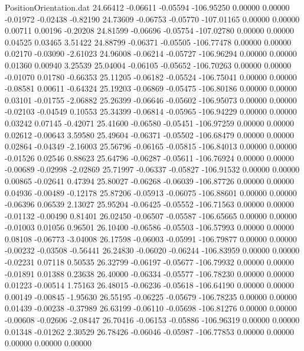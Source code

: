 \begin{filecontents}{PositionOrientation.dat}
  24.66412   -0.06611   -0.05594  -106.95250    0.00000    0.00000   -0.01972   -0.02438   -0.82190
  24.73609   -0.06753   -0.05770  -107.01165    0.00000    0.00000    0.00711    0.00196   -0.20208
  24.81599   -0.06696   -0.05754  -107.02780    0.00000    0.00000    0.04525    0.03465    3.51422
  24.88799   -0.06371   -0.05505  -106.77478    0.00000    0.00000    0.02170   -0.03090   -2.61023
  24.96008   -0.06214   -0.05727  -106.96294    0.00000    0.00000    0.01360    0.00940    3.25539
  25.04004   -0.06105   -0.05652  -106.70263    0.00000    0.00000   -0.01070    0.01780   -0.66353
  25.11205   -0.06182   -0.05524  -106.75041    0.00000    0.00000   -0.08581    0.00611   -0.64324
  25.19203   -0.06869   -0.05475  -106.80186    0.00000    0.00000    0.03101   -0.01755   -2.06882
  25.26399   -0.06646   -0.05602  -106.95073    0.00000    0.00000   -0.02103   -0.04549    0.10553
  25.34399   -0.06814   -0.05965  -106.94229    0.00000    0.00000    0.03242    0.07145   -0.42071
  25.41600   -0.06580   -0.05451  -106.97259    0.00000    0.00000    0.02612   -0.00643    3.59580
  25.49604   -0.06371   -0.05502  -106.68479    0.00000    0.00000    0.02864   -0.04349   -2.16003
  25.56796   -0.06165   -0.05815  -106.84013    0.00000    0.00000   -0.01526    0.02546    0.88623
  25.64796   -0.06287   -0.05611  -106.76924    0.00000    0.00000   -0.00689   -0.02998   -2.02869
  25.71997   -0.06337   -0.05827  -106.91532    0.00000    0.00000    0.00865   -0.02641    0.47394
  25.80027   -0.06268   -0.06039  -106.87726    0.00000    0.00000    0.04936   -0.00489   -0.12178
  25.87206   -0.05913   -0.06075  -106.88601    0.00000    0.00000   -0.06396    0.06539    2.13027
  25.95204   -0.06425   -0.05552  -106.71563    0.00000    0.00000   -0.01132   -0.00490    0.81401
  26.02450   -0.06507   -0.05587  -106.65665    0.00000    0.00000   -0.01003    0.01056    0.96501
  26.10400   -0.06586   -0.05503  -106.57993    0.00000    0.00000    0.08108   -0.06773   -3.04008
  26.17598   -0.06003   -0.05991  -106.79877    0.00000    0.00000   -0.00232   -0.03508   -0.56441
  26.24830   -0.06020   -0.06244  -106.83959    0.00000    0.00000   -0.02231    0.07118    0.50535
  26.32799   -0.06197   -0.05677  -106.79932    0.00000    0.00000   -0.01891    0.01388    0.23638
  26.40000   -0.06334   -0.05577  -106.78230    0.00000    0.00000    0.01223   -0.00514    1.75163
  26.48015   -0.06236   -0.05618  -106.64190    0.00000    0.00000    0.00149   -0.00845   -1.95630
  26.55195   -0.06225   -0.05679  -106.78235    0.00000    0.00000    0.01439   -0.00238   -0.37989
  26.63199   -0.06110   -0.05698  -106.81276    0.00000    0.00000   -0.00608   -0.02606   -2.08447
  26.70416   -0.06153   -0.05886  -106.96319    0.00000    0.00000    0.01348   -0.01262    2.30529
  26.78426   -0.06046   -0.05987  -106.77853    0.00000    0.00000    0.00000    0.00000    0.00000
\end{filecontents}

